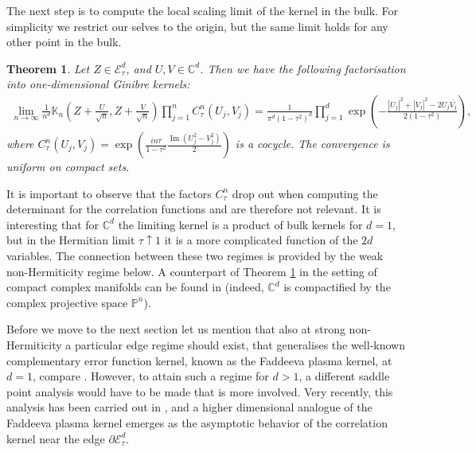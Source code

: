 \documentclass[%
 jmp,
cp,  %
 amsmath,amsthm,amssymb,%
 reprint,%
onecolumn]{revtex4-2}
\newtheorem{theorem}{Theorem}[section]
\begin{document}
       
        
        
        The next step is to compute the local scaling limit of the kernel in the bulk. For simplicity we restrict our selves to the origin, but the same limit holds for any other point in the bulk. 
        \begin{theorem} \label{thm:Cd_bulk_intro}
        Let $Z\in \mathcal E_\tau^d$, and $U, V\in\mathbb{C}^d$. Then we have 
        the following factorisation into one-dimensional Ginibre kernels:
        \begin{align*}
            \lim_{n\to\infty} \frac{1}{n^d} \mathbb K_n\left(Z+\frac{U}{\sqrt n}, Z+\frac{V}{\sqrt n}\right) \prod_{j=1}^n C_{\tau}^n(U_j, V_j)
            =  \frac{1}{\pi^d (1-\tau^2)^d} \prod_{j=1}^d
   \exp\left(-\frac{|U_j|^2+|V_j|^2-2 U_j \overline{V_j}}{2(1-\tau^2)}\right),
            \end{align*}
            where $C_{\tau}^n(U_j,V_j) = \exp\left(\frac{i n \tau }{ 1-\tau^2} \frac{\operatorname{Im}(U_j^2-V_j^2)}{2}\right)$ is a cocycle. The convergence is uniform on compact sets. 
        \end{theorem}
        It is important to observe that the factors $C_{\tau}^n$  drop out when computing the determinant for the correlation functions and are therefore not relevant. 
        It is interesting that for $\mathbb C^d$ the limiting kernel is a product of bulk kernels for $d=1$, but in the Hermitian limit $\tau \uparrow 1$ it is a more complicated function of the $2d$ variables. 
           The connection between these two regimes is provided by the weak non-Hermiticity regime below. A counterpart of Theorem \ref{thm:Cd_bulk_intro} in the setting of compact complex manifolds can be found in \cite[Theorem 1.1]{Berman} (indeed, $\mathbb C^d$ is compactified by the complex projective space $\mathbb P^n$).
         
Before we move to the next section let us mention that  also at strong non-Hermiticity a particular edge regime should exist, that generalises the well-known complementary error function kernel, known as the Faddeeva plasma kernel, at $d=1$, compare \cite{TV}. However, to attain such a regime   for $d>1$, a different saddle point analysis would have to be made that is more involved. Very recently, this analysis has been carried out in \cite{Molag}, and a higher dimensional analogue of the Faddeeva plasma kernel emerges as the asymptotic behavior of the correlation kernel near the edge $\partial\mathcal E_\tau^d$.
        
\end{document}
